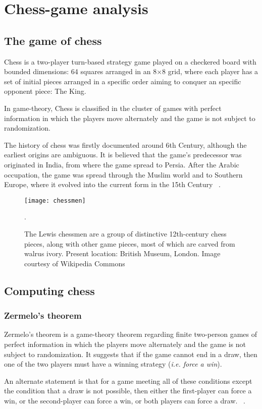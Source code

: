 \chapter{Chess-game analysis}

\section{The game of chess}

Chess is a two-player turn-based strategy game played on a checkered board with bounded dimensions: 64 squares arranged in an 8×8 grid, where each player has a set of initial pieces arranged in a specific order aiming to conquer an specific opponent piece: The King.

In game-theory, Chess is classified in the cluster of games with perfect information in which the players move alternately and the game is not subject to randomization.

The history of chess was firstly documented around 6th Century, although the earliest origins are ambiguous. It is believed that the game's predecessor was originated in India, from where the game spread to Persia. After the Arabic occupation, the game was spread through the Muslim world and to Southern Europe, where it evolved into the current form in the 15th Century ~\cite{murray1913history}.


    \begin{figure}[H]
        \centering
        \texttt{[image: chessmen]}
        \caption{The Lewis chessmen are a group of distinctive 12th-century chess pieces, along with other game pieces, most of which are carved from walrus ivory. Present location: British Museum, London. Image courtesy of Wikipedia Commons}.
    \end{figure}

\section{Computing chess}

\subsection{Zermelo's theorem}

\begin{theorem} 
Zermelo's theorem is a game-theory theorem regarding finite two-person games of perfect information in which the players move alternately and the game is not subject to randomization. It suggests that if the game cannot end in a draw, then one of the two players must have a winning strategy (\textit{i.e. force a win}). 

An alternate statement is that for a game meeting all of these conditions except the condition that a draw is not possible, then either the first-player can force a win, or the second-player can force a win, or both players can force a draw. ~\cite{schwalbe2001zermelo}. 
\end{theorem}

